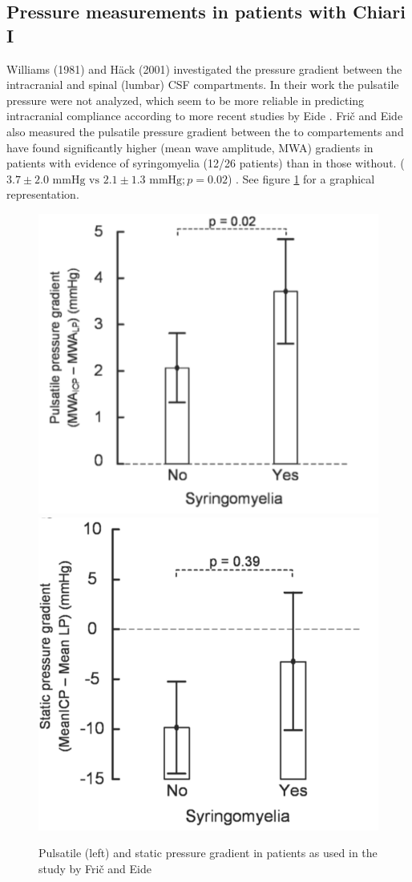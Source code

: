 \subsection{Pressure measurements in patients with Chiari I}
Williams (1981) \cite{Will81} and H{\"a}ck (2001) \cite{Hack01} investigated the pressure gradient between the intracranial and spinal (lumbar) CSF compartments. In their work the pulsatile pressure were not analyzed, which seem to be more reliable in predicting intracranial compliance according to more recent studies by Eide \cite{Eide11_Rand,Eide10_Amp,Eide11_Hyper,Eide10_Diag}.
Fri{\v{c}} and Eide also measured the pulsatile pressure gradient between the to compartements and have found significantly higher (mean wave amplitude, MWA) gradients in patients with evidence of syringomyelia (12/26 patients) than in those without. ($3.7 \pm 2.0 \text{ mmHg vs } 2.1 \pm 1.3 \text{ mmHg}; p=0.02$) \cite{Fric15}. See figure \ref{fig:Syrinx} for a graphical representation. 
\begin{center}
\begin{figure}[!ht]
\includegraphics[width=0.4\linewidth]{figures/Eide_pressure_Syrinx}
\includegraphics[width=0.375\linewidth]{figures/Eide_static}
\caption{Pulsatile (left) and static pressure gradient in patients as used in the study by Fri{\v{c}} and Eide \cite{Fric15}}\label{fig:Syrinx}
\end{figure}
\end{center}
